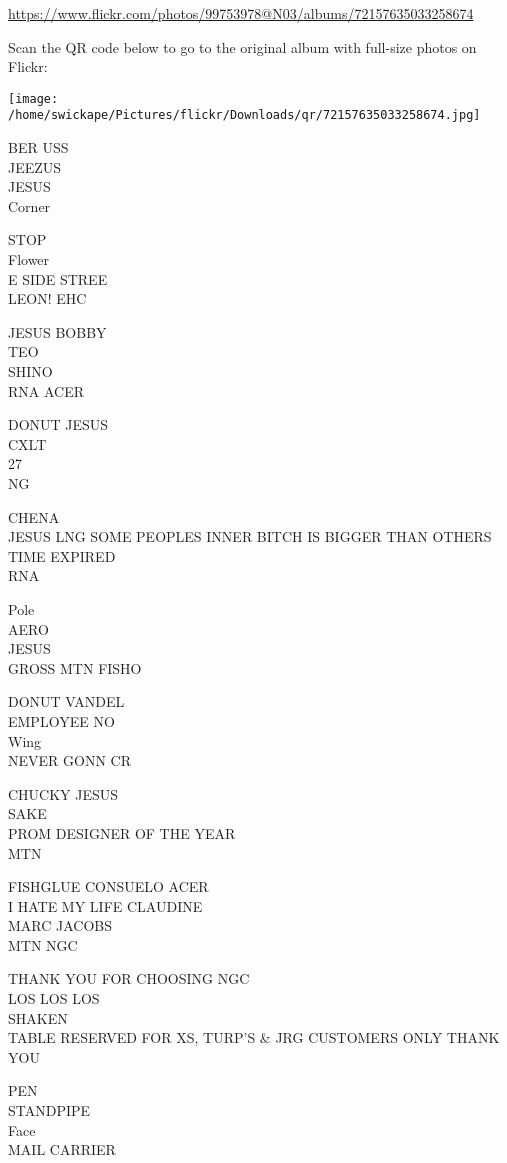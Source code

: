 \documentclass[10pt,letterpaper]{article}
\begin{document}
\url{https://www.flickr.com/photos/99753978@N03/albums/72157635033258674}

Scan the QR code below to go to the original album with full-size photos on Flickr:

\texttt{[image: /home/swickape/Pictures/flickr/Downloads/qr/72157635033258674.jpg]}


BER USS\\
JEEZUS\\
JESUS\\
Corner

STOP\\
Flower\\
E SIDE STREE\\
LEON! EHC

JESUS BOBBY\\
TEO\\
SHINO\\
RNA ACER

DONUT JESUS\\
CXLT\\
27\\
NG

CHENA\\
JESUS LNG SOME PEOPLES INNER BITCH IS BIGGER THAN OTHERS\\
TIME EXPIRED\\
RNA

Pole\\
AERO\\
JESUS\\
GROSS MTN FISHO

DONUT VANDEL\\
EMPLOYEE NO\\
Wing\\
NEVER GONN CR

CHUCKY JESUS\\
SAKE\\
PROM DESIGNER OF THE YEAR\\
MTN

FISHGLUE CONSUELO ACER\\
I HATE MY LIFE CLAUDINE\\
MARC JACOBS\\
MTN NGC

THANK YOU FOR CHOOSING NGC\\
LOS LOS LOS\\
SHAKEN\\
TABLE RESERVED FOR XS, TURP'S \& JRG CUSTOMERS ONLY THANK YOU

PEN\\
STANDPIPE\\
Face\\
MAIL CARRIER
\end{document}
